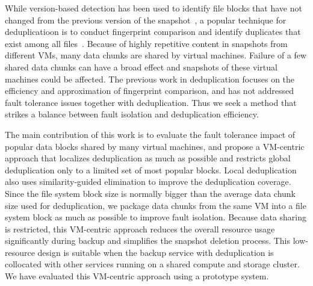 While version-based detection has been used to identify file blocks that have not 
changed from the previous version of the snapshot~\cite{Clements2009,Vrable2009,TanIPDPS2011},
a popular technique for deduplicatioon is to 
conduct fingerprint  comparison and identify duplicates that exist
among all files~\cite{Guo2011,Dong2011,extreme_binning09}. 
Because of highly repetitive content in snapshots from different VMs,
many data chunks are shared by virtual machines.  
Failure of a few shared data chunks can have a 
broad effect and snapshots of these virtual machines could be affected.
The previous work in deduplication focuses on the efficiency and approximation of
fingerprint comparison, and has not addressed fault tolerance issues  together with deduplication.
Thus we seek a method that strikes a balance between fault isolation and deduplication efficiency.


The main contribution of this work is to evaluate the fault tolerance  impact of popular data blocks shared by many
virtual machines, and   propose a VM-centric approach that localizes deduplication as much as possible 
and restricts global deduplication only to a limited set of most popular blocks.
Local deduplication also uses similarity-guided elimination to improve the deduplication coverage.
Since the file system block size is normally bigger than the average data chunk size used for deduplication,
we package data chunks from the same VM into a file system block as much as possible to improve fault isolation.
Because data sharing is restricted, 
this VM-centric approach reduces the overall resource usage significantly during backup and
simplifies the snapshot deletion process. This low-resource design
is suitable when the backup service with deduplication is collocated with other services running on a shared compute and storage
cluster.  We have evaluated this VM-centric approach using  a prototype system.



